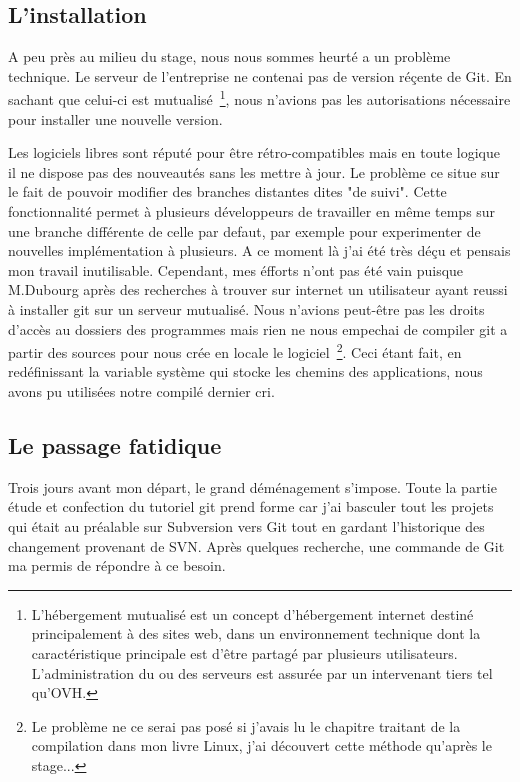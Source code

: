\subsection{L'installation} %
\label{sec:L'installation}

A peu près au milieu du stage, nous nous sommes heurté a un problème technique.
Le serveur de l'entreprise ne contenai pas de version réçente de Git. En
sachant que celui-ci est mutualisé\, \footnote{L'hébergement mutualisé est un
concept d'hébergement internet destiné principalement à des sites web, dans un
environnement technique dont la caractéristique principale est d'être partagé
par plusieurs utilisateurs. L'administration du ou des serveurs est assurée par
un intervenant tiers tel qu'OVH.}, nous n'avions pas les autorisations
nécessaire pour installer une nouvelle version.

Les logiciels libres sont réputé pour être rétro-compatibles mais en toute
logique il ne dispose pas des nouveautés sans les mettre à jour. Le problème ce
situe sur le fait de pouvoir modifier des branches distantes dites "de suivi".
Cette fonctionnalité permet à plusieurs développeurs de travailler en même
temps sur une branche différente de celle par defaut, par exemple pour
experimenter de nouvelles implémentation à plusieurs. A ce moment là j'ai été
très déçu et pensais mon travail inutilisable. Cependant, mes éfforts n'ont pas
été vain puisque M.Dubourg après des recherches à trouver sur internet un
utilisateur ayant reussi à installer git sur un serveur mutualisé. Nous
n'avions peut-être pas les droits d'accès au dossiers des programmes mais rien
ne nous empechai de compiler git a partir des sources pour nous crée en locale
le logiciel\, \footnote{Le problème ne ce serai pas posé si j'avais lu le
chapitre traitant de la compilation dans mon livre Linux, j'ai découvert cette
méthode qu'après le stage...}. Ceci étant fait, en redéfinissant la variable
système qui stocke les chemins des applications, nous avons pu utilisées notre
compilé dernier cri.

\subsection{Le passage fatidique} %
\label{sec:Le passage fatidique}

Trois jours avant mon départ, le grand déménagement s'impose. Toute la partie
étude et confection du tutoriel git prend forme car j'ai basculer tout les
projets qui était au préalable sur Subversion vers Git tout en gardant
l'historique des changement provenant de SVN. Après quelques recherche, une
commande de Git ma permis de répondre à ce besoin.

